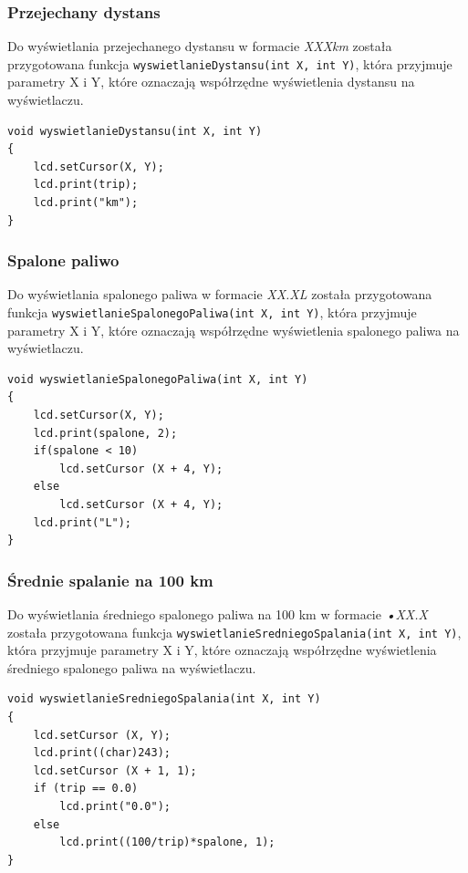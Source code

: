\subsubsection{Przejechany dystans}
Do wyświetlania przejechanego dystansu w formacie \textit{XXXkm} została przygotowana funkcja \texttt{wyswietlanieDystansu(int X, int Y)}, która przyjmuje parametry X i Y, które oznaczają współrzędne wyświetlenia dystansu na wyświetlaczu.
\begin{lstlisting}[label=list:show_millage,caption=Wyświetlanie dystansu,
basicstyle=\footnotesize\ttfamily]
void wyswietlanieDystansu(int X, int Y)
{
    lcd.setCursor(X, Y);
    lcd.print(trip);
    lcd.print("km");
}
\end{lstlisting}

\subsubsection{Spalone paliwo}
Do wyświetlania spalonego paliwa w formacie \textit{XX.XL} została przygotowana funkcja \texttt{wyswietlanieSpalonegoPaliwa(int X, int Y)}, która przyjmuje parametry X i Y, które oznaczają współrzędne wyświetlenia spalonego paliwa na wyświetlaczu.
\begin{lstlisting}[label=list:show_fuel_burned,caption=Wyświetlanie spalonego paliwa,
basicstyle=\footnotesize\ttfamily]
void wyswietlanieSpalonegoPaliwa(int X, int Y)
{
    lcd.setCursor(X, Y);
    lcd.print(spalone, 2);
    if(spalone < 10)
    	lcd.setCursor (X + 4, Y);
    else
    	lcd.setCursor (X + 4, Y);
    lcd.print("L");
}
\end{lstlisting}

\subsubsection{Średnie spalanie na 100 km}
Do wyświetlania średniego spalonego paliwa na 100 km w formacie \textit{•XX.X} została przygotowana funkcja \texttt{wyswietlanieSredniegoSpalania(int X, int Y)}, która przyjmuje parametry X i Y, które oznaczają współrzędne wyświetlenia średniego spalonego paliwa na wyświetlaczu.
\begin{lstlisting}[label=list:show_fuel_avarge,caption=Wyświetlanie średniego spalonego paliwa na 100km,
basicstyle=\footnotesize\ttfamily]
void wyswietlanieSredniegoSpalania(int X, int Y)
{
    lcd.setCursor (X, Y);
    lcd.print((char)243);
    lcd.setCursor (X + 1, 1);
    if (trip == 0.0)
    	lcd.print("0.0");
    else
    	lcd.print((100/trip)*spalone, 1);
}
\end{lstlisting}

